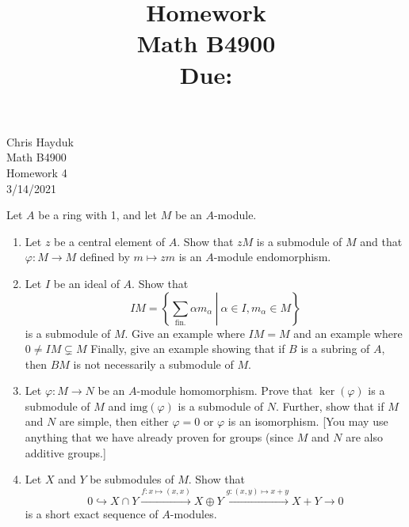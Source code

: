 \documentclass[11pt, reqno]{amsart}
\title[Homework \HW]{Homework \HW \\
Math B4900\\
\small Due: \DUE}
\author{}
\theoremstyle{plain}
\theoremstyle{definition}
\theoremstyle{example}
\def\img{\mathrm{img}}
\def\f{\varphi}
\def\HW{4}
\def\DUE{3/14/2021}
\begin{document}
\begin{flushright}
Chris Hayduk\\
Math B4900\\
Homework \HW\\
\DUE
\end{flushright}


Let $A$ be a ring with 1, and let $M$ be an $A$-module.
\begin{enumerate}[1.]
\item Let $z$ be a central element of $A$. Show that $zM$ is a submodule of $M$ and that $\f: M \to M$ defined by $m \mapsto zm$ is an $A$-module endomorphism.

\item Let $I$ be an ideal of $A$. Show that 
$$IM = \left\{ \left. \sum_{\text{fin.}} \alpha m_\alpha ~\right|~ \alpha \in I, m_\alpha \in M\right\}$$
is a submodule of $M$. Give an example where $IM = M$ and an example where $0 \ne IM \subsetneq M$ Finally, give an example showing that if $B$ is a subring of $A$, then $BM$ is not necessarily a submodule of $M$.

\item Let $\f: M \to N$ be an $A$-module homomorphism. Prove that $\ker(\f)$ is a submodule of $M$ and $\img(\f)$ is a submodule of $N$. Further, show that if $M$ and $N$ are simple, then either $\f = 0$ or  $\f$ is an isomorphism. {[You may use anything that we have already proven for groups (since $M$ and $N$ are also additive groups.]}

\item Let $X$ and $Y$ be submodules of $M$. Show that
$$0 \hookrightarrow X \cap Y \xrightarrow{f: x \mapsto (x,x)} 
	X \oplus Y \xrightarrow{g: (x,y) \mapsto x + y} X + Y \to 0$$
is a short exact sequence of $A$-modules. 


\end{enumerate}
\end{document}
